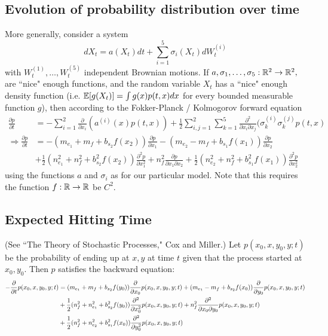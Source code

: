 \documentclass{article}
\begin{document}
\subsection{Evolution of probability distribution over time }
More generally, consider a system
$$ dX_t=a(X_t)dt+\sum_{i=1}^5\sigma_i(X_t)dW_t^{(i)}$$
with $W_t^{(1)},\dots,W_t^{(5)}$ independent Brownian motions.
If $a,\sigma_1,\dots,\sigma_5:{\mathbb{R}}^2\to{\mathbb{R}}^2,$ are ``nice" enough functions, and the random variable $X_t$ has a ``nice" enough density function (i.e. ${\mathbb{E}}[g(X_t)]=\int g(x)p(t,x)dx$ for every bounded measurable function $g$), then according to the Fokker-Planck / Kolmogorov forward equation
\begin{align*}
\frac{\partial p}{\partial t}&=-\sum_{i=1}^2\frac{\partial}{\partial x_i}(a^{(i)}(x)p(t,x))+\frac{1}{2}\sum_{i,j=1}^2\sum_{k=1}^5\frac{\partial^2}{\partial x_i\partial x_j}(\sigma_k^{(i)}\sigma_k^{(j)}p(t,x)
\\ \Rightarrow \frac{\partial p}{\partial t}&=-(m_{e_1}+m_f+b_{s_2}f(x_2))\frac{\partial p}{\partial x_1}-(m_{e_2}-m_f+b_{s_1}f(x_1))\frac{\partial p}{\partial x_2}
\\&+\frac{1}{2}(n_{e_1}^2+n_f^2+b_{s_2}^2f(x_2))\frac{\partial^2 p}{\partial x_1^2}+n_f^2\frac{\partial p}{\partial x_1\partial x_2}+\frac{1}{2}(n_{e_2}^2+n_f^2+b_{s_1}^2f(x_1))\frac{\partial^2 p}{\partial x_2^2}
\end{align*}
using the functions $a$ and $\sigma_i$ as for our particular model.  Note that this requires the function $f:{\mathbb{R}}\to{\mathbb{R}}$ be $C^2$.

\subsection{Expected Hitting Time }
(See ``The Theory of Stochastic Processes," Cox and Miller.)  Let $p(x_0,x,y_0,y;t)$ be the probability of ending up at $x,y$ at time $t$ given that the process started at $x_0,y_0$.  Then $p$ satisfies the backward equation:
\begin{align}
-\frac{\partial}{\partial t}p(x_0,x,y_0,y;t)&=(m_{e_1}+m_f+b_{s_2}f(y_0))\frac{\partial}{\partial x_0}p(x_0,x,y_0,y;t)+(m_{e_1}-m_f+b_{s_2}f(x_0))\frac{\partial}{\partial y_0}p(x_0,x,y_0,y;t) \notag
\\&+\frac{1}{2}(n_f^2+n_{e_1}^2+b_{s_2}^2f(y_0))\frac{\partial^2}{\partial x_0^2}p(x_0,x,y_0,y;t)+n_f^2\frac{\partial^2}{\partial x_0\partial y_0}p(x_0,x,y_0,y;t) \notag
\\&+\frac{1}{2}(n_f^2+n_{e_2}^2+b_{s_1}^2f(x_0))\frac{\partial^2}{\partial y_0^2}p(x_0,x,y_0,y;t) \label{back}
\end{align}
\end{document}
